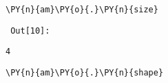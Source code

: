 {\par%
\vspace{-1\baselineskip}%
}%
\begin{notebookcell}[10]%
\begin{addmargin}[\cellleftmargin]{0em}%
{\smaller%
\par%
%
\vspace{-1\smallerfontscale}%
\begin{Verbatim}[commandchars=\\\{\}]
\PY{n}{am}\PY{o}{.}\PY{n}{size}
\end{Verbatim}
%
\par%
\vspace{-1\smallerfontscale}}%
\end{addmargin}
\end{notebookcell}

\par\vspace{1\smallerfontscale}%
    
        {\par%
        \vspace{-1\smallerfontscale}%
        \noindent%
        \begin{minipage}{\cellleftmargin}%
    \hfill%
    {\smaller%
    \tt%
    \color{nbframe-out-prompt}%
    Out[10]:}%
    \hspace{\inputpadding}%
    \hspace{0em}%
    \hspace{3pt}%
    \end{minipage}%
        }%
    \begin{addmargin}[\cellleftmargin]{0em}%
    {\smaller%
    \vspace{-1\smallerfontscale}%
    
    
    
    \begin{verbatim}
4
    \end{verbatim}

    
}%
    \end{addmargin}%

{\par%
\vspace{-1\baselineskip}%
}%
\begin{notebookcell}[11]%
\begin{addmargin}[\cellleftmargin]{0em}%
{\smaller%
\par%
%
\vspace{-1\smallerfontscale}%
\begin{Verbatim}[commandchars=\\\{\}]
\PY{n}{am}\PY{o}{.}\PY{n}{shape}
\end{Verbatim}
%
\par%
\vspace{-1\smallerfontscale}}%
\end{addmargin}
\end{notebookcell}

